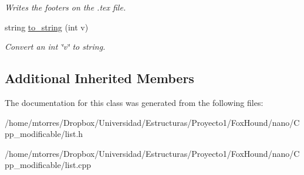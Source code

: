 \begin{DoxyCompactItemize}
\begin{DoxyCompactList}\small\item\em Writes the footers on the .tex file. \end{DoxyCompactList}\item 
\hypertarget{classlist_af38e18a21e1631f6f0e381aefe4262fe}{string \hyperlink{classlist_af38e18a21e1631f6f0e381aefe4262fe}{to\-\_\-string} (int v)}\label{classlist_af38e18a21e1631f6f0e381aefe4262fe}

\begin{DoxyCompactList}\small\item\em Convert an int \char`\"{}v\char`\"{} to string. \end{DoxyCompactList}\end{DoxyCompactItemize}
\subsection*{Additional Inherited Members}


The documentation for this class was generated from the following files\-:\begin{DoxyCompactItemize}
\item 
/home/mtorres/\-Dropbox/\-Universidad/\-Estructuras/\-Proyecto1/\-Fox\-Hound/nano/\-Cpp\-\_\-modificable/list.\-h\item 
/home/mtorres/\-Dropbox/\-Universidad/\-Estructuras/\-Proyecto1/\-Fox\-Hound/nano/\-Cpp\-\_\-modificable/list.\-cpp\end{DoxyCompactItemize}
